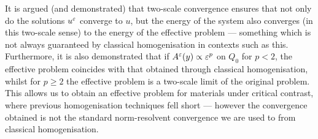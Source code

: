 It is argued (and demonstrated) that two-scale convergence ensures that not only do the solutions $u^{\varepsilon}$ converge to $u$, but the energy of the system also converges (in this two-scale sense) to the energy of the effective problem --- something which is not always guaranteed by classical homogenisation in contexts such as this.
Furthermore, it is also demonstrated that if $A^{\varepsilon}(y)\propto\varepsilon^p$ on $Q_0$ for $p<2$, the effective problem coincides with that obtained through classical homogenisation, whilst for $p\geq 2$ the effective problem is a two-scale limit of the original problem.
This allows us to obtain an effective problem for materials under critical contrast, where previous homogenisation techniques fell short --- however the convergence obtained is not the standard norm-resolvent convergence we are used to from classical homogenisation.

